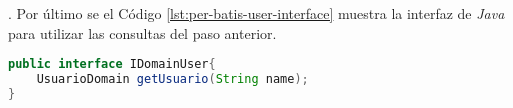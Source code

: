 . Por último se el Código \ref{lst:per-batis-user-interface} muestra la interfaz de \textit{Java} para utilizar las consultas del paso anterior.
\begin{lstlisting}[language=Java, caption={Interfaz de \textit{Java} para la fábrica de \textit{MyBatis}.}, captionpos=b, label={lst:per-batis-user-interface}]
public interface IDomainUser{
	UsuarioDomain getUsuario(String name);
}
\end{lstlisting}
